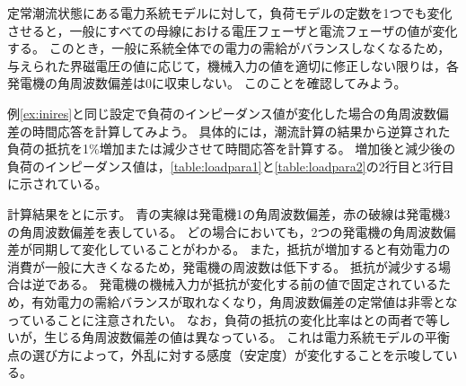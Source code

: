 \documentclass[tombow,dvipdfmx]{corona-a5-1.1}
\begin{document}
定常潮流状態にある電力系統モデルに対して，負荷モデルの定数を1つでも変化させると，一般にすべての母線における電圧フェーザと電流フェーザの値が変化する。
このとき，一般に系統全体での電力の需給がバランスしなくなるため，与えられた界磁電圧の値に応じて，機械入力の値を適切に修正しない限りは，各発電機の角周波数偏差は0に収束しない。
このことを確認してみよう。

\begin{例}[負荷のインピーダンス変化に対する電力系統モデルの時間応答]\label{ex:loadpv}
例\ref{ex:inires}と同じ設定で負荷のインピーダンス値が変化した場合の角周波数偏差の時間応答を計算してみよう。
具体的には，潮流計算の結果から逆算された負荷の抵抗を1\%増加または減少させて時間応答を計算する。
増加後と減少後の負荷のインピーダンス値は，\ref{table:loadpara1}と\ref{table:loadpara2}の2行目と3行目に示されている。

計算結果をとに示す。
青の実線は発電機1の角周波数偏差，赤の破線は発電機3の角周波数偏差を表している。
どの場合においても，2つの発電機の角周波数偏差が同期して変化していることがわかる。
また，抵抗が増加すると有効電力の消費が一般に大きくなるため，発電機の周波数は低下する。
抵抗が減少する場合は逆である。
発電機の機械入力が抵抗が変化する前の値で固定されているため，有効電力の需給バランスが取れなくなり，角周波数偏差の定常値は非零となっていることに注意されたい。
なお，負荷の抵抗の変化比率はとの両者で等しいが，生じる角周波数偏差の値は異なっている。
これは電力系統モデルの平衡点の選び方によって，外乱に対する感度（安定度）が変化することを示唆している。
\end{例}
\end{document}
